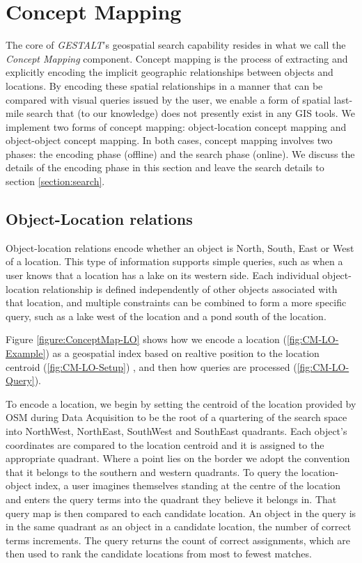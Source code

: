 \section{Concept Mapping}
\label{section:concept}

The core of \emph{GESTALT}'s geospatial search capability resides in what we call the \emph{Concept Mapping} component.
Concept mapping is the process of extracting and explicitly encoding the implicit geographic relationships between objects and locations. 
By encoding these spatial relationships in a manner that can be compared with visual queries issued by the user, we enable a form of spatial last-mile search that (to our knowledge) does not presently exist in any GIS tools.
We implement two forms of concept mapping: object-location concept mapping and object-object concept mapping.
In both cases, concept mapping involves two phases: the encoding phase (offline) and the search phase (online). 
We discuss the details of the encoding phase in this section and leave the search details to section \ref{section:search}.


\subsection{Object-Location relations}
Object-location relations encode whether an object is North, South, East or West of a location. 
This type of information supports simple queries, such as when a user knows that a location has a lake on its western side. 
Each individual object-location relationship is defined independently of other objects associated with that location, and multiple constraints can be combined to form a more specific query, such as a lake west of the location and a pond south of the location.

Figure \ref{figure:ConceptMap-LO} shows how we encode a location (\ref{fig:CM-LO-Example}) as a geospatial index based on realtive position to the location centroid (\ref{fig:CM-LO-Setup}) , and then how queries are processed (\ref{fig:CM-LO-Query}).

To encode a location, we begin by setting the centroid of the location provided by OSM during Data Acquisition to be the root of a quartering of the search space into NorthWest, NorthEast, SouthWest and SouthEast quadrants. 
Each object's coordinates are compared to the location centroid and it is assigned to the appropriate quadrant. 
Where a point lies on the border we adopt the convention that it belongs to the southern and western quadrants. 
To query the location-object index, a user imagines themselves standing at the centre of the location and enters the query terms into the quadrant they believe it belongs in. 
That query map is then compared to each candidate location. An object in the query is in the same quadrant as an object in a candidate location, the number of correct terms increments.
The query returns the count of correct assignments, which are then used to rank the candidate locations from most to fewest matches. 

